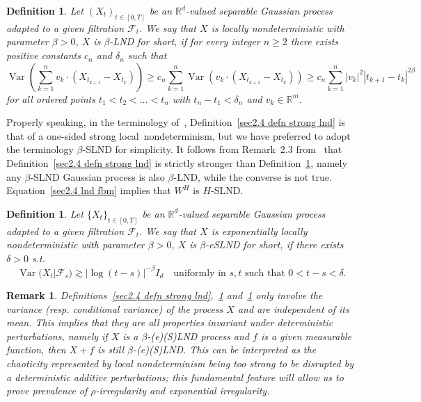 \documentclass[10pt]{article}
\newcommand{\nobracket}{}
\newcommand{\tmop}[1]{\ensuremath{\operatorname{#1}}}
\newtheorem{definition}[theorem]{Definition}
\newtheorem{remark}[theorem]{Remark}
\begin{document}
\begin{definition}
  \label{sec2.4 defn lnd}Let $(X_t)_{t \in [0, T]}$ be an
  $\mathbb{R}^d$-valued separable Gaussian process adapted to a given
  filtration $\mathcal{F}_t$. We say that $X$ is locally nondeterministic with
  parameter $\beta > 0$, $X$ is $\beta$\mbox{-}LND for short, if for every
  integer $n \geqslant 2$ there exists positive constants $c_n$ and $\delta_n$
  such that
  \begin{equation}
    \tmop{Var} \left( \sum_{k = 1}^n v_k \cdot (X_{t_{k + 1}} - X_{t_k})
    \right) \geqslant c_n \sum_{k = 1}^n \tmop{Var} (v_k \cdot (X_{t_{k + 1}}
    - X_{t_k})) \geqslant c_n \sum_{k = 1}^n | v_k |^2  | t_{k + 1} - t_k |^{2 \beta}
    \label{sec2.4 defn lnd eq}
  \end{equation}
  for all ordered points $t_1 < t_2 < \ldots < t_n$ with $t_n - t_1 <
  \delta_n$ and $v_k \in \mathbb{R}^m$.
\end{definition}

Properly speaking, in the terminology of~{\cite{xiao}}, Definition~\ref{sec2.4
defn strong lnd} is that of a one\mbox{-}sided strong local~nondeterminism,
but we have preferred to adopt the terminology $\beta$\mbox{-}SLND for
simplicity. It follows from Remark~2.3 from~{\cite{xiao}} that
Definition~\ref{sec2.4 defn strong lnd} is strictly stronger than
Definition~\ref{sec2.4 defn lnd}, namely any $\beta$\mbox{-}SLND Gaussian
process is also $\beta$\mbox{-}LND, while the converse is not true.
Equation~\eqref{sec2.4 lnd fbm} implies that $W^H$ is $H$\mbox{-}SLND.

\begin{definition}
  \label{sec2.4 defn exp lnd}Let $\{ X_t \}_{t \in [0, T]}$ be an
  $\mathbb{R}^d$-valued separable Gaussian process adapted to a given
  filtration $\mathcal{F}_t$. We say that $X$ is exponentially locally
  nondeterministic with parameter $\beta > 0$, $X$ is $\beta$\mbox{-}eSLND for
  short, if there exists $\delta > 0$ s.t.
  \begin{equation}
    \tmop{Var} (X_t | \mathcal{F}_s \nobracket) \gtrsim | \log (t - s) |^{-
    \beta} I_d \quad \text{uniformly in } s, t \text{ such that } 0 < t - s <
    \delta . \label{sec2.4 exp lnd eq}
  \end{equation}
\end{definition}

\begin{remark}
  \label{sec2.4 remark invariance lnd}Definitions~\ref{sec2.4 defn strong
  lnd},~\ref{sec2.4 defn lnd} and~\ref{sec2.4 defn exp lnd} only involve the
  variance (resp. conditional variance) of the process $X$ and are independent
  of its mean. This implies that they are all properties invariant under
  deterministic perturbations, namely if $X$ is a $\beta$\mbox{-}(e)(S)LND
  process and $f$ is a given measurable function, then $X + f$ is still
  $\beta$\mbox{-}(e)(S)LND. This can be interpreted as the chaoticity
  represented by local nondeterminism being too strong to be disrupted by a
  deterministic additive perturbations; this fundamental feature will allow us
  to prove prevalence of $\rho$\mbox{-}irregularity and exponential
  irregularity.
\end{remark}
\end{document}
